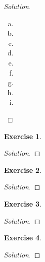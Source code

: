\documentclass[12pt,a4]{article}
\theoremstyle{definition}
\newtheorem{exercise}{Exercise}
\begin{document}
\begin{proof}[Solution]
\begin{enumerate}[(a)]
		\item 
		
		\item 
		
		\item 
		
		\item 
		
		\item 
		
		\item 
		
		\item 
		
		\item 
		
		\item 
	\end{enumerate}
\end{proof}

\begin{exercise}
	
\end{exercise}
\begin{proof}[Solution]
	
\end{proof}

\begin{exercise}
	
\end{exercise}
\begin{proof}[Solution]
	
\end{proof}

\begin{exercise}
	
\end{exercise}
\begin{proof}[Solution]
	
\end{proof}

\begin{exercise}
	
\end{exercise}
\begin{proof}[Solution]
	
\end{proof}
\end{document}
